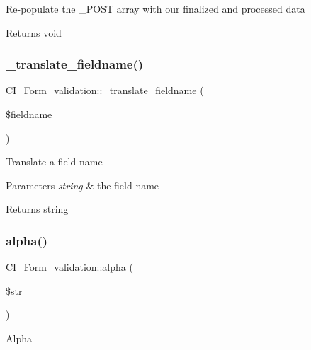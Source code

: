 Re-\/populate the \+\_\+\+P\+O\+ST array with our finalized and processed data

\begin{DoxyReturn}{Returns}
void 
\end{DoxyReturn}
\mbox{\label{class_c_i___form__validation_ac79ae8e18dde776103fdf8ad6cfb48b1}} 
\subsubsection{\texorpdfstring{\+\_\+translate\+\_\+fieldname()}{\_translate\_fieldname()}}
{\footnotesize\ttfamily C\+I\+\_\+\+Form\+\_\+validation\+::\+\_\+translate\+\_\+fieldname (\begin{DoxyParamCaption}\item[{}]{\$fieldname }\end{DoxyParamCaption})\hspace{0.3cm}{\ttfamily [protected]}}

Translate a field name


\begin{DoxyParams}{Parameters}
{\em string} & the field name \\
\hline
\end{DoxyParams}
\begin{DoxyReturn}{Returns}
string 
\end{DoxyReturn}
\mbox{\label{class_c_i___form__validation_a02269f4592c13d8746f6fab60074152a}} 
\subsubsection{\texorpdfstring{alpha()}{alpha()}}
{\footnotesize\ttfamily C\+I\+\_\+\+Form\+\_\+validation\+::alpha (\begin{DoxyParamCaption}\item[{}]{\$str }\end{DoxyParamCaption})}

Alpha


